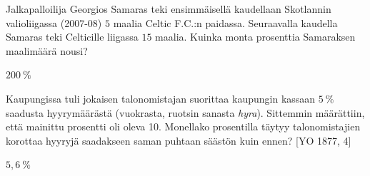 \begin{tehtavasivu}
\begin{tehtava}
    Jalkapalloilija Georgios Samaras teki ensimmäisellä kaudellaan Skotlannin valioliigassa (2007-08)
    $5$ maalia Celtic F.C.:n paidassa. Seuraavalla kaudella Samaras teki Celticille liigassa $15$ maalia.
    Kuinka monta prosenttia Samaraksen maalimäärä nousi?
    \begin{vastaus}
        $200~\%$
    \end{vastaus}
\end{tehtava}

\begin{tehtava}
    Kaupungissa tuli jokaisen talonomistajan suorittaa kaupungin kassaan $5~\%$ saadusta
    hyyrymäärästä (vuokrasta, ruotsin sanasta \textit{hyra}). Sittemmin määrättiin, että mainittu
    prosentti oli oleva 10. Monellako prosentilla täytyy talonomistajien korottaa hyyryjä
    saadakseen saman puhtaan säästön kuin ennen? [YO 1877, 4]
    \begin{vastaus}
        $5,6~\%$
    \end{vastaus}
\end{tehtava}

\end{tehtavasivu}
